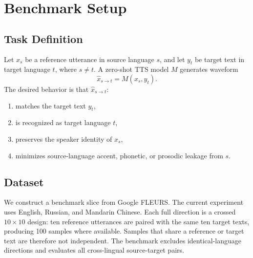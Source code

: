 \documentclass[11pt]{article}
\begin{document}
\section{Benchmark Setup}

\subsection{Task Definition}

Let $x_s$ be a reference utterance in source language $s$, and let $y_t$ be target text in target language $t$, where $s \neq t$. A zero-shot TTS model $M$ generates waveform
\begin{equation}
    \hat{x}_{s\rightarrow t} = M(x_s, y_t).
\end{equation}
The desired behavior is that $\hat{x}_{s\rightarrow t}$:
\begin{enumerate}[leftmargin=1.5em]
    \item matches the target text $y_t$,
    \item is recognized as target language $t$,
    \item preserves the speaker identity of $x_s$,
    \item minimizes source-language accent, phonetic, or prosodic leakage from $s$.
\end{enumerate}

\subsection{Dataset}

We construct a benchmark slice from Google FLEURS. The current experiment uses English, Russian, and Mandarin Chinese. Each full direction is a crossed $10\times10$ design: ten reference utterances are paired with the same ten target texts, producing 100 samples where available. Samples that share a reference or target text are therefore not independent. The benchmark excludes identical-language directions and evaluates all cross-lingual source-target pairs.
\end{document}
